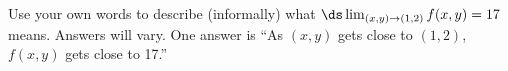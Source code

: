 {Use your own words to describe (informally) what $\ds \lim_{(x,y)\to (1,2)} f(x,y) = 17$ means.}
{Answers will vary. One answer is ``As $(x,y)$ gets close to $(1,2)$, $f(x,y)$ gets close to 17.''
}